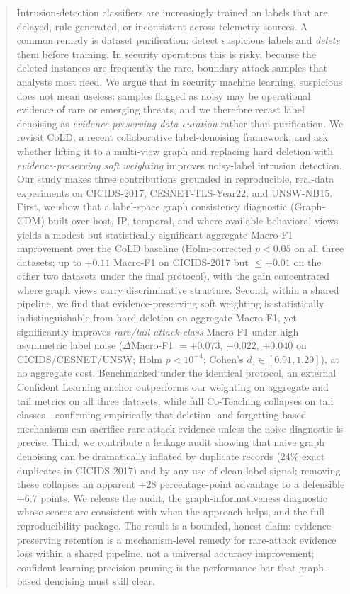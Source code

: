 \documentclass[preprint,3p,times]{elsarticle}
\begin{document}
\begin{frontmatter}
\begin{abstract}
Intrusion-detection classifiers are increasingly trained on labels that are
delayed, rule-generated, or inconsistent across telemetry sources. A common
remedy is dataset purification: detect suspicious labels and \emph{delete} them
before training. In security operations this is risky, because the deleted
instances are frequently the rare, boundary attack samples that analysts most
need. We argue that in security machine learning, suspicious does not mean
useless: samples flagged as noisy may be operational evidence of rare or
emerging threats, and we therefore recast label denoising as
\emph{evidence-preserving data curation} rather than purification.
We revisit CoLD, a recent collaborative label-denoising framework, and ask
whether lifting it to a multi-view graph and replacing hard deletion with
\emph{evidence-preserving soft weighting} improves noisy-label intrusion
detection. Our study makes three contributions grounded in reproducible,
real-data experiments on CICIDS-2017, CESNET-TLS-Year22, and UNSW-NB15.
First, we show that a label-space graph consistency diagnostic (Graph-CDM) built
over host, IP, temporal, and where-available behavioral views yields a modest but
statistically significant aggregate Macro-F1 improvement over the CoLD baseline
(Holm-corrected $p<0.05$ on all three datasets; up to $+0.11$ Macro-F1 on
CICIDS-2017 but $\leq+0.01$ on the other two datasets under the final protocol),
with the gain concentrated where graph views carry discriminative structure.
Second, within a shared pipeline, we find that evidence-preserving
soft weighting is statistically indistinguishable from hard deletion on aggregate
Macro-F1, yet significantly improves \emph{rare/tail attack-class} Macro-F1 under
high asymmetric label noise ($\Delta$Macro-F1 $=+0.073$, $+0.022$, $+0.040$ on
CICIDS/CESNET/UNSW; Holm $p<10^{-4}$; Cohen's $d_z\in[0.91,1.29]$), at no
aggregate cost. Benchmarked under the identical protocol, an external Confident
Learning anchor outperforms our weighting on aggregate and tail metrics on all
three datasets, while full Co-Teaching collapses on tail classes---confirming
empirically that deletion- and forgetting-based mechanisms can sacrifice
rare-attack evidence unless the noise diagnostic is precise. Third, we contribute
a leakage audit showing that naive graph
denoising can be dramatically inflated by duplicate records (24\% exact duplicates
in CICIDS-2017) and by any use of clean-label signal; removing these collapses an
apparent $+28$ percentage-point advantage to a defensible $+6.7$ points. We
release the audit, the graph-informativeness diagnostic whose scores are
consistent with when the approach helps, and the full reproducibility package.
The result is a bounded,
honest claim: evidence-preserving retention is a mechanism-level remedy for
rare-attack evidence loss within a shared pipeline, not a universal accuracy
improvement; confident-learning-precision pruning is the performance bar that
graph-based denoising must still clear.
\end{abstract}


\end{frontmatter}
\end{document}
